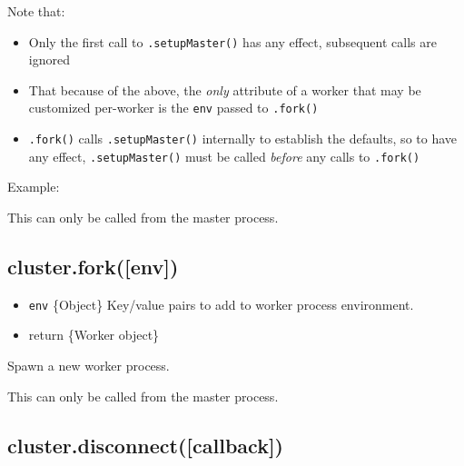 Note that:

\begin{itemize}
\itemsep1pt\parskip0pt
\item
  Only the first call to \texttt{.setupMaster()} has any effect,
  subsequent calls are ignored
\item
  That because of the above, the \emph{only} attribute of a worker that
  may be customized per-worker is the \texttt{env} passed to
  \texttt{.fork()}
\item
  \texttt{.fork()} calls \texttt{.setupMaster()} internally to establish
  the defaults, so to have any effect, \texttt{.setupMaster()} must be
  called \emph{before} any calls to \texttt{.fork()}
\end{itemize}

Example:

\begin{Shaded}
\begin{Highlighting}[]
 \NormalTok{(}\NormalTok{);}
\NormalTok{(\{}
  \NormalTok{: }\NormalTok{,}
  \NormalTok{: [}\NormalTok{, }\NormalTok{],}
  \NormalTok{: }
\NormalTok{\});}
\NormalTok{();}
\end{Highlighting}
\end{Shaded}

This can only be called from the master process.

\subsection{cluster.fork({[}env{]})}\label{cluster.forkenv}

\begin{itemize}
\itemsep1pt\parskip0pt
\item
  \texttt{env} \{Object\} Key/value pairs to add to worker process
  environment.
\item
  return \{Worker object\}
\end{itemize}

Spawn a new worker process.

This can only be called from the master process.

\subsection{cluster.disconnect({[}callback{]})}\label{cluster.disconnectcallback}

